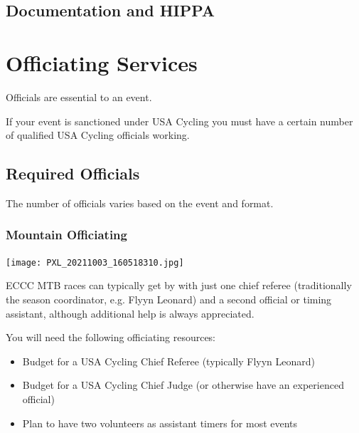 \documentclass[
  letterpaper, %
  fontsize=10pt, %
  twoside=true,
  chapterentrydots=true, %
  numbers=noenddot,
  fontmethod=tex,
]{kaobook}
\begin{document}
\subsection{Documentation and HIPPA}

\section{Officiating Services}

Officials are essential to an event.

If your event is sanctioned %
under USA Cycling
you must have a certain number of qualified USA Cycling officials working.

\subsection{Required Officials}

The number of officials varies based on the event and format.

\subsubsection{Mountain Officiating}

\begin{marginfigure}
\texttt{[image: PXL\_20211003\_160518310.jpg]}
\caption[MTB STXC Finish Line]{
          A Short-Track Cross Country %
          finish line can be run with a very small crew.\\
          Credit: Katie Aman}
\end{marginfigure}

ECCC MTB races can typically get by with just one chief referee
(traditionally the season coordinator, e.g. Flyyn Leonard)
and a second official or timing assistant,
although additional help is always appreciated.

\begin{kaobox}[title=Note for Team-Hosted MTB Races]
You will need the following officiating resources:

\begin{itemize}
  \item Budget for a USA Cycling Chief Referee (typically Flyyn Leonard)
  \item Budget for a USA Cycling Chief Judge (or otherwise have an experienced official)
  \item Plan to have two volunteers as assistant timers for most events
\end{itemize}
\end{kaobox}
\end{document}
